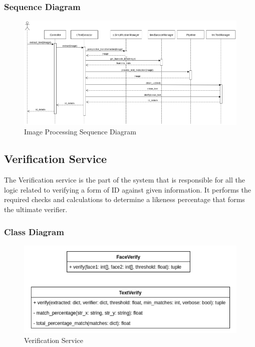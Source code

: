 \documentclass{article}
\begin{document}
\subsubsection{Sequence Diagram}
\begin{figure}[H]
	    \centering
	    \includegraphics[scale=0.5]{img/extract_sequence.png}
	    \caption{Image Processing Sequence Diagram}
	 \end{figure}
	 \pagebreak
	 
\subsection{Verification Service}
The Verification service is the part of the system that is responsible for all the logic related to verifying a form of ID against given information. It performs the required checks and calculations to determine a likeness percentage that forms the ultimate verifier.
\subsubsection{Class Diagram}
	\begin{figure}[H]
	    \centering
	    \includegraphics[scale=0.5]{img/VerifyClass.png}
	    \caption{Verification Service}
	 \end{figure}
	 \pagebreak
\end{document}
